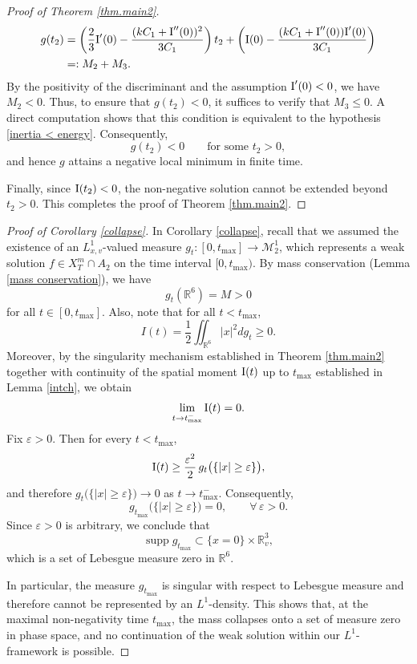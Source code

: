 \documentclass[reqno,11pt,final]{amsart}
\theoremstyle{plain}
\numberwithin{equation}{section}
\numberwithin{theorem}{section}
\begin{document}
\begin{proof}[Proof of Theorem \ref{thm.main2}]
\begin{align*}
g(t_2)
&= \left(\frac{2}{3}\textup{I}'(0)
      - \frac{(kC_1 + \textup{I}''(0))^2}{3C_1}\right)t_2
   + \left(\textup{I}(0) - \frac{(kC_1 + \textup{I}''(0))\textup{I}'(0)}{3C_1}\right) \\
&=: M_2 + M_3.
\end{align*}
By the positivity of the discriminant and the assumption $\textup{I}'(0)<0$, we have
$M_2<0$. Thus, to ensure that $g(t_2)<0$, it suffices to verify that
$M_3\le0$. A direct computation shows that this condition is equivalent to the hypothesis \eqref{inertia < energy}. Consequently,
$$
g(t_2) < 0 \qquad \text{for some } t_2>0,
$$
and hence $g$ attains a negative local minimum in finite time.


Finally, since $\textup{I}(t_2)<0$, the non-negative solution cannot be extended beyond $t_2>0$. This completes the proof of Theorem \ref{thm.main2}.
\end{proof}

\begin{proof}[Proof of Corollary \ref{collapse}]
In Corollary \ref{collapse}, recall that we assumed the existence of an $L^1_{x,v}$-valued measure $g_t: [0,t_{\max}]\to \mathcal{M}^1_2$, which represents a weak solution $f\in X_T^m\cap A_2$ on the time interval $[0,t_{\max})$. By mass conservation (Lemma \ref{mass conservation}), we have $$g_t(\mathbb{R}^6)=M>0$$ for all $t\in[0,t_{\max}].$ Also, note that for all $t<t_{\max}$, $$I(t)=\frac{1}{2}\iint_{\mathbb{R}^6}|x|^2 dg_t\ge 0.$$ Moreover, by the singularity mechanism established in Theorem \ref{thm.main2} together with continuity of the spatial moment $\textup{I}(t)$ up to $t_{\max}$ established in Lemma \ref{intch}, we obtain 
$$
\lim_{t\to t_{\max}^-} \textup{I}(t)=0.
$$
Fix $\varepsilon>0$. Then for every $t<t_{\max}$,
$$
\textup{I}(t)\ge \frac{\varepsilon^2}{2}\,g_t\big(\{|x|\ge\varepsilon\}\big),
$$
and therefore $g_t\big(\{|x|\ge\varepsilon\}\big)\to 0$ as $t\to t_{\max}^-$.
Consequently,
$$
g_{t_{\max}}\big(\{|x|\ge\varepsilon\}\big)=0,\qquad \forall\,\varepsilon>0.
$$
Since $\varepsilon>0$ is arbitrary, we conclude that
$$
\operatorname{supp}g_{t_{\max}}\subset\{x=0\}\times\mathbb{R}^3_v,
$$
which is a set of Lebesgue measure zero in $\mathbb{R}^6$.

In particular, the measure $g_{t_{\max}}$ is singular with respect to Lebesgue measure and therefore cannot be represented by an $L^1$-density. This shows that, at the maximal non-negativity time $t_{\max}$, the mass collapses onto a set of measure zero in phase space, and no continuation of the weak solution within our $L^1$-framework is possible.
\end{proof}
\end{document}
